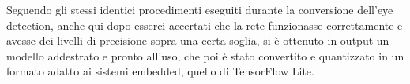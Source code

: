 Seguendo gli stessi identici procedimenti eseguiti durante la conversione dell'eye detection, anche qui dopo esserci accertati che la rete funzionasse correttamente e avesse dei livelli di precisione sopra una certa soglia, si è ottenuto in output un modello addestrato e pronto all’uso, che poi è stato convertito e quantizzato in un formato adatto ai sistemi embedded, quello di TensorFlow Lite.
